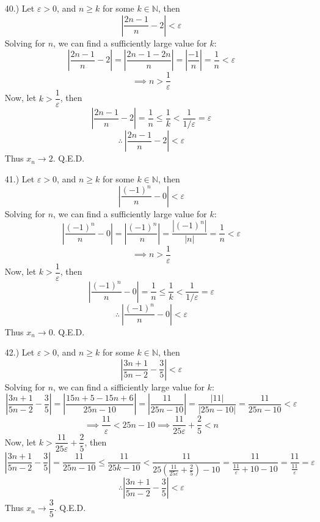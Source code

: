 \documentclass[12pt]{article}
\newcommand{\vertb}[1]{\left\vert#1\right\vert}
\newcommand{\parns}[1]{\left(#1\right)}
\begin{document}
\begin{itemize}


    \item [40.)] Let $\varepsilon>0$, and $n\geq k$ for some $k\in\mathbb{N}$, then
    \[\vertb{\frac{2n-1}{n}-2}<\varepsilon\]
    Solving for $n$, we can find a sufficiently large value for $k$:
    \[\vertb{\frac{2n-1}{n}-2}=\vertb{\frac{2n-1-2n}{n}}=\vertb{\frac{-1}{n}}=\frac{1}{n}<\varepsilon\]
    \[\implies n>\frac{1}{\varepsilon}\]
    Now, let $k>\dfrac{1}{\varepsilon}$, then
    \[\vertb{\frac{2n-1}{n}-2}=\frac{1}{n}\leq\frac{1}{k}<\frac{1}{1/\varepsilon}=\varepsilon\]
    \[\therefore\ \vertb{\frac{2n-1}{n}-2}<\varepsilon\]
    Thus $x_n\to2$. Q.E.D.

    \item [41.)] Let $\varepsilon>0$, and $n\geq k$ for some $k\in\mathbb{N}$, then
    \[\vertb{\frac{(-1)^n}{n}-0}<\varepsilon\]
    Solving for $n$, we can find a sufficiently large value for $k$:
    \[\vertb{\frac{(-1)^n}{n}-0}=\vertb{\frac{(-1)^n}{n}}=\frac{\vertb{(-1)^n}}{\vertb{n}}=\frac{1}{n}<\varepsilon\]
    \[\implies n>\frac{1}{\varepsilon}\]
    Now, let $k>\dfrac{1}{\varepsilon}$, then
    \[\vertb{\frac{(-1)^n}{n}-0}=\frac{1}{n}\leq\frac{1}{k}<\frac{1}{1/\varepsilon}=\varepsilon\]
    \[\therefore\ \vertb{\frac{(-1)^n}{n}-0}<\varepsilon\]
    Thus $x_n\to0$. Q.E.D.

    \pagebreak
    \item [42.)] Let $\varepsilon>0$, and $n\geq k$ for some $k\in\mathbb{N}$, then
    \[\vertb{\frac{3n+1}{5n-2}-\frac{3}{5}}<\varepsilon\]
    Solving for $n$, we can find a sifficiently large value for $k$:
    \[\vertb{\frac{3n+1}{5n-2}-\frac{3}{5}}=\vertb{\frac{15n+5-15n+6}{25n-10}}=\vertb{\frac{11}{25n-10}}=\frac{\vertb{11}}{\vertb{25n-10}}=\frac{11}{25n-10}<\varepsilon\]
    \[\implies\frac{11}{\varepsilon}<25n-10\implies\frac{11}{25\varepsilon}+\frac{2}{5}<n\]
    Now, let $k>\dfrac{11}{25\varepsilon}+\dfrac{2}{5}$, then
    \[\vertb{\frac{3n+1}{5n-2}-\frac{3}{5}}=\frac{11}{25n-10}\leq\frac{11}{25k-10}<\frac{11}{25\parns{\frac{11}{25\varepsilon}+\frac{2}{5}}-10}=\frac{11}{\frac{11}{\varepsilon}+10-10}=\frac{11}{\frac{11}{\varepsilon}}=\varepsilon\]
    \[\therefore\vertb{\frac{3n+1}{5n-2}-\frac{3}{5}}<\varepsilon\]
    Thus $x_n\to\dfrac{3}{5}$. Q.E.D.



\end{itemize}
\end{document}
